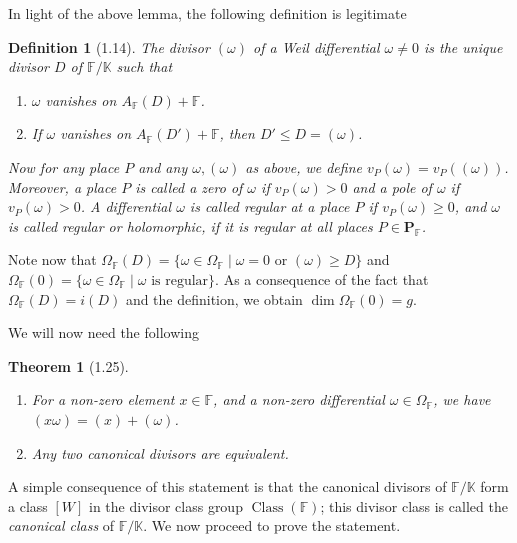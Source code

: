 \documentclass[11pt]{article}
\theoremstyle{scplain}
\newtheorem*{definition}{Definition}
\newtheorem*{theorem}{Theorem}
\DeclareMathOperator{\Class}{Class}
\begin{document}
In light of the above lemma, the following definition is legitimate

\begin{definition}[1.14]
The divisor $(\omega)$ of a Weil differential $\omega \neq 0$ is the unique
divisor $D$ of $\mathbb{F}/\mathbb{K}$ such that
\begin{enumerate}
\item[(a)] $\omega$ vanishes on $A_{\mathbb{F}}(D)+\mathbb{F}$.

\item[(b)] If $\omega$ vanishes on $A_{\mathbb{F}}(D')+\mathbb{F}$, then
$D' \leq D=(\omega)$.
\end{enumerate}

Now for any place $P$ and any $\omega,(\omega)$ as above, we define
$v_P(\omega)=v_P((\omega))$. Moreover, a place $P$ is called a zero of $\omega$
if $v_P(\omega)>0$ and a pole of $\omega$ if $v_P(\omega)>0$. A differential
$\omega$ is called regular at a place $P$ if $v_P(\omega) \geq 0$, and $\omega$
is called regular or holomorphic, if it is regular at all places
$P \in \mathbf{P}_{\mathbb{F}}$.
\end{definition}

Note now that
$\Omega_{\mathbb{F}}(D)=\{\omega \in \Omega_{\mathbb{F}} \mid
\omega=0 \text{ or } (\omega)\geq D\}$ and
$\Omega_{\mathbb{F}}(0)=\{\omega \in \Omega_{\mathbb{F}} \mid
\omega \text{ is regular}\}$. As a consequence of the fact that
$\Omega_{\mathbb{F}}(D)=i(D)$ and the definition, we obtain
$\dim\Omega_{\mathbb{F}}(0)=g$.

We will now need the following

\begin{theorem}[1.25]
\begin{enumerate}
\item[(a)] For a non-zero element $x \in \mathbb{F}$, and a non-zero
differential $\omega \in \Omega_{\mathbb{F}}$, we have
$(x\omega)=(x)+(\omega)$.

\item[(b)] Any two canonical divisors are equivalent.
\end{enumerate}
\end{theorem}

\medskip{} A simple consequence of this statement is
that the canonical divisors of $\mathbb{F}/\mathbb{K}$ form a class $[W]$ in the
divisor class group $\Class(\mathbb{F})$; this divisor class is called the
\emph{canonical class} of $\mathbb{F}/\mathbb{K}$. We now proceed to prove the
statement.
\end{document}
